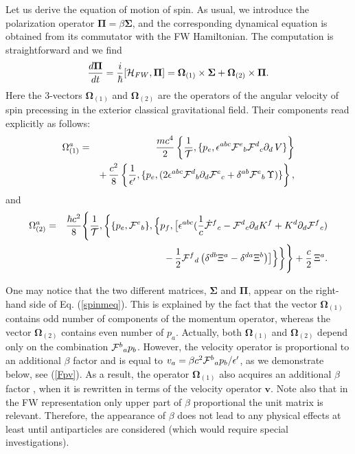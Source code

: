\documentclass[preprint,showpacs,preprintnumbers,eqsecnum,amsmath,amssymb]{revtex4-1}
\begin{document}
Let us derive the equation of motion of spin. As usual, we introduce the
polarization operator $\bm\Pi=\beta\bm\Sigma$, and the corresponding dynamical
equation is obtained from its commutator with the FW Hamiltonian. 
The computation is straightforward and we find
\begin{equation}
\frac{d\bm \Pi}{dt}=\frac{i}{\hbar}[{\cal H}_{FW},\bm \Pi]=\bm\Omega_{(1)}
\times\bm \Sigma+\bm\Omega_{(2)}\times\bm\Pi.\label{spinmeq}
\end{equation}
Here the 3-vectors $\bm\Omega_{(1)}$ and $\bm\Omega_{(2)}$ are the operators of
the angular velocity of spin precessing in the exterior classical gravitational
field. Their components read explicitly as follows:
\begin{eqnarray}
\Omega^a_{(1)} &=& \frac{mc^4}{2}\left\{{\frac 1{\cal T}}, \{p_e,
\epsilon^{abc}{\cal F}^e{}_b{\cal F}^d{}_c\partial_d\,V\}\right\}\nonumber\\
&& +\,\frac{c^2}{8}\left\{
\frac{1}{\epsilon'},\{p_e,(2\epsilon^{abc} {\cal
F}^d{}_b\partial_d{\cal F}^e{}_c + \delta^{ab}{\cal
F}^e{}_b\,\Upsilon)\} \right\},\label{eqol}
\end{eqnarray}
and
\begin{eqnarray}
\Omega^a_{(2)} &=& \frac{\hbar c^2}{8}\Biggl\{\frac{1}{{\cal
T}},\biggl\{ \{p_e,{\cal
F}^e{}_b\},\Bigl\{p_f,\bigl[\epsilon^{abc}({\frac 1c} \dot{\cal
F}^f{}_c - {\cal F}^d{}_c\partial_dK^f + K^d\partial_d{\cal
F}^f{}_c
)\nonumber\\
&& -\,{\frac 12}{\cal F}^f{}_d\left(\delta^{db}\Xi^a -
\delta^{da}\Xi^b\right) \bigr]\Bigr\}\biggr\}\Biggr\} + {\frac
c2}\,\Xi^a. \label{finalOmega}
\end{eqnarray}

One may notice that the two different matrices, $\bm\Sigma$ and $\bm\Pi$, appear 
on the right-hand side of Eq. (\ref{spinmeq}). This is explained by the fact that 
the vector $\bm\Omega_{(1)}$ contains odd number of components of the momentum operator,
whereas the vector $\bm\Omega_{(2)}$ contains even number of $p_a$. Actually,
both $\bm\Omega_{(1)}$ and $\bm\Omega_{(2)}$ depend only on the combination
${\cal F}^b{}_a p_b$. However, the velocity operator is proportional to an
additional $\beta$ factor and is equal to $v_a = \beta c^2{\cal F}^b{}_a
p_b/\epsilon'$, as we demonstrate below, see (\ref{Fpv}). As a result, the
operator $\bm\Omega_{(1)}$ also acquires an additional $\beta$ factor \cite{OST},
when it is rewritten in terms of the velocity operator $\bm v$. Note also that 
in the FW representation only upper part of $\beta$ proportional the unit matrix 
is relevant. Therefore, the appearance of $\beta$ does not lead to any physical 
effects at least until antiparticles are considered (which would require 
special investigations).
\end{document}
